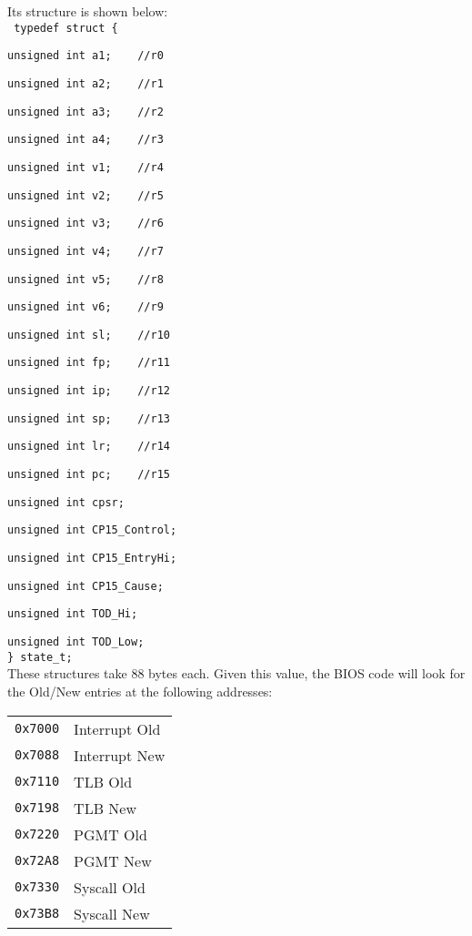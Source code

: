 Its structure is shown below:
\nopagebreak
\\
\texttt{ typedef struct \{}

\nopagebreak
\texttt{unsigned int a1;\ \ \ \ //r0}

\nopagebreak
\texttt{unsigned int a2;\ \ \ \ //r1}

\nopagebreak
\texttt{unsigned int a3;\ \ \ \ //r2}

\nopagebreak
\texttt{unsigned int a4;\ \ \ \ //r3}

\nopagebreak
\texttt{unsigned int v1;\ \ \ \ //r4}

\nopagebreak
\texttt{unsigned int v2;\ \ \ \ //r5}

\nopagebreak
\texttt{unsigned int v3;\ \ \ \ //r6}

\nopagebreak
\texttt{unsigned int v4;\ \ \ \ //r7}

\nopagebreak
\texttt{unsigned int v5;\ \ \ \ //r8}

\nopagebreak
\texttt{unsigned int v6;\ \ \ \ //r9}

\nopagebreak
\texttt{unsigned int sl;\ \ \ \ //r10}

\nopagebreak
\texttt{unsigned int fp;\ \ \ \ //r11}

\nopagebreak
\texttt{unsigned int ip;\ \ \ \ //r12}

\nopagebreak
\texttt{unsigned int sp;\ \ \ \ //r13}

\nopagebreak
\texttt{unsigned int lr;\ \ \ \ //r14}

\nopagebreak
\texttt{unsigned int pc;\ \ \ \ //r15}

\nopagebreak
\texttt{unsigned int cpsr;}

\nopagebreak
\texttt{unsigned int CP15\_Control;}

\nopagebreak
\texttt{unsigned int CP15\_EntryHi;}

\nopagebreak
\texttt{unsigned int CP15\_Cause;}

\nopagebreak
\texttt{unsigned int TOD\_Hi;}

\nopagebreak
\texttt{unsigned int TOD\_Low;}\\
\nopagebreak
\texttt{\} state\_t; }
\\

These structures take 88 bytes each. Given this value, the BIOS code will look for the Old/New entries at the following addresses:
\\

\begin{tabular}{r|l}
\texttt{0x7000} & Interrupt Old \\
\texttt{0x7088} & Interrupt New \\
\texttt{0x7110} & TLB Old \\
\texttt{0x7198} & TLB New \\
\texttt{0x7220} & PGMT Old \\
\texttt{0x72A8} & PGMT New \\
\texttt{0x7330} & Syscall Old \\
\texttt{0x73B8} & Syscall New \\
\end{tabular}

